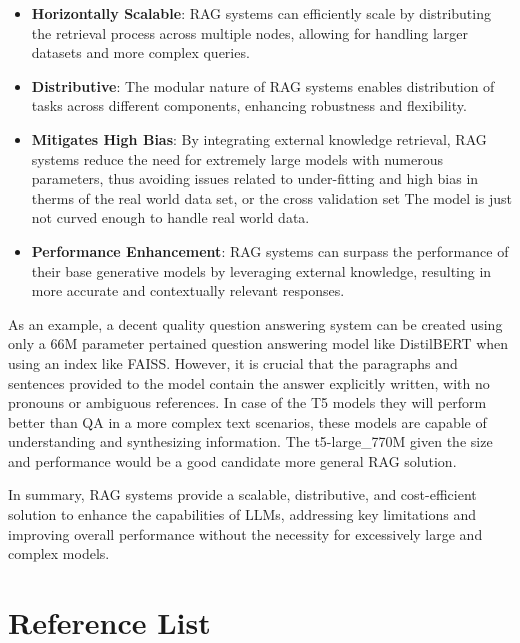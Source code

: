 \documentclass[11pt]{wseas}
\begin{document}
\begin{itemize}
\tightlist
\item
  \textbf{Horizontally Scalable}: RAG systems can efficiently scale by
  distributing the retrieval process across multiple nodes, allowing for
  handling larger datasets and more complex queries.
\item
  \textbf{Distributive}: The modular nature of RAG systems enables
  distribution of tasks across different components, enhancing
  robustness and flexibility.
\item
  \textbf{Mitigates High Bias}: By integrating external knowledge
  retrieval, RAG systems reduce the need for extremely large models with
  numerous parameters, thus avoiding issues related to under-fitting and
  high bias in therms of the real world data set, or the cross
  validation set The model is just not curved enough to handle real
  world data.
\item
  \textbf{Performance Enhancement}: RAG systems can surpass the
  performance of their base generative models by leveraging external
  knowledge, resulting in more accurate and contextually relevant
  responses.
\end{itemize}

As an example, a decent quality question answering system can be created
using only a 66M parameter pertained question answering model like
DistilBERT when using an index like FAISS. However, it is crucial that
the paragraphs and sentences provided to the model contain the answer
explicitly written, with no pronouns or ambiguous references. In case of
the T5 models they will perform better than QA in a more complex text
scenarios, these models are capable of understanding and synthesizing
information. The t5-large\_770M given the size and performance would be
a good candidate more general RAG solution.

In summary, RAG systems provide a scalable, distributive, and
cost-efficient solution to enhance the capabilities of LLMs, addressing
key limitations and improving overall performance without the necessity
for excessively large and complex models.

    \section{Reference List}\label{reference-list}
\end{document}
